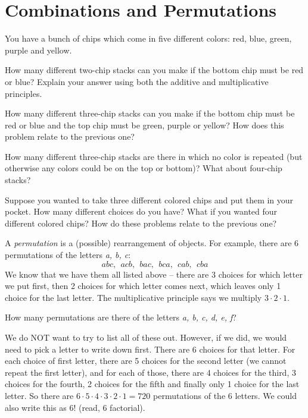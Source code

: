 \documentclass[12pt]{article}
\begin{document}
\section{Combinations and Permutations}\label{sec:comb-perm}

\begin{activity}
You have a bunch of chips which come in five different colors: red, blue, green, purple and yellow.
\begin{questions} 

\question How many different two-chip stacks can you make if the bottom chip must be red or blue?  Explain your answer using both the additive and multiplicative principles.

\question How many different three-chip stacks can you make if the bottom chip must be red or blue and the top chip must be green, purple or yellow?  How does this problem relate to the previous one?

\question How many different three-chip stacks are there in which no color is repeated (but otherwise any colors could be on the top or bottom)? What about four-chip stacks?

\question Suppose you wanted to take three different colored chips and put them in your pocket.  How many different choices do you have?  What if you wanted four different colored chips?  How do these problems relate to the previous one?

\end{questions}
\end{activity}

A {\em permutation} is a (possible) rearrangement of objects.  For example, there are 6 permutations of the letters \textit{a, b, c}:
\[abc, ~~ acb, ~~ bac, ~~bca, ~~ cab, ~~ cba\]
We know that we have them all listed above -- there are 3 choices for which letter we put first, then 2 choices for which letter comes next, which leaves only 1 choice for the last letter.  The multiplicative principle says we multiply $3\cdot 2 \cdot 1$.

\begin{example}
  How many permutations are there of the letters \textit{a, b, c, d, e, f}?
  \begin{solution}
    We do NOT want to try to list all of these out.  However, if we did, we would need to pick a letter to write down first.  There are 6 choices for that letter.  For each choice of first letter, there are 5 choices for the second letter (we cannot repeat the first letter), and for each of those, there are 4 choices for the third, 3 choices for the fourth, 2 choices for the fifth and finally only 1 choice for the last letter.  So there are $6 \cdot 5 \cdot 4 \cdot 3 \cdot 2 \cdot 1 = 720$ permutations of the 6 letters.  We could also write this as $6!$ (read, 6 factorial).
  \end{solution}
\end{example}
\end{document}

